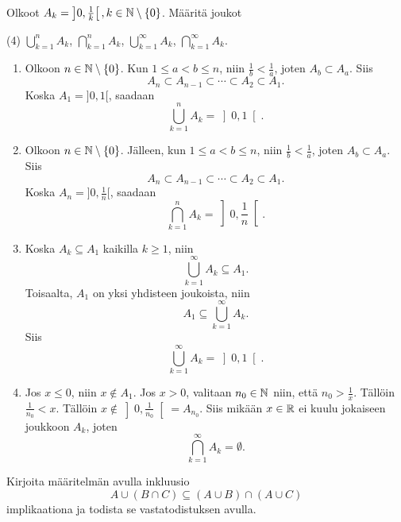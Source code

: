 \documentclass[11pt,a4paper]{amsart}
\begin{document}
\begin{exercise}
Olkoot \(A_k = \left]0, \frac{1}{k}\right[, k \in \mathbb{N} \setminus \left\lbrace0\right\rbrace\).
Määritä joukot
\begin{tasks}(4)
\task \(\displaystyle \bigcup_{k=1}^n A_k\),
\task \(\displaystyle \bigcap_{k=1}^n A_k\),
\task \(\displaystyle \bigcup_{k=1}^{\infty} A_k\),
\task \(\displaystyle \bigcap_{k=1}^{\infty} A_k\).
\end{tasks}
\end{exercise}

\begin{solution}
\leavevmode\par
\begin{enumerate}[label=\alph*), nosep]
\item Olkoon \(n \in \mathbb{N} \setminus{\left\lbrace0\right\rbrace}\). Kun \(1 \leq a < b \leq n\),
niin \(\frac{1}{b} < \frac{1}{a}\), joten \(A_b \subset A_a\). Siis
\[
A_n \subset A_{n - 1} \subset \cdots \subset A_2 \subset A_1.
\]
Koska \(A_1 = ]0, 1[\), saadaan
\[
\bigcup_{k=1}^n A_k = \left]0, 1\right[.
\]

\item Olkoon \(n \in \mathbb{N} \setminus{\left\lbrace0\right\rbrace}\). Jälleen, kun \(1 \leq
a < b \leq n\),
niin \(\frac{1}{b} < \frac{1}{a}\), joten \(A_b \subset A_a\). Siis
\[
A_n \subset A_{n - 1} \subset \cdots \subset A_2 \subset A_1.
\]
Koska \(A_n = ]0, \frac{1}{n}[\), saadaan
\[
\bigcap_{k=1}^n A_k = \left]0, \frac{1}{n}\right[.
\]

\item Koska \(A_k \subseteq A_1\) kaikilla \(k \geq 1\), niin
\[
\bigcup_{k=1}^{\infty} A_k \subseteq A_1.
\]
Toisaalta, \(A_1\) on yksi yhdisteen joukoista, niin
\[
A_1 \subseteq \bigcup_{k=1}^{\infty} A_k.
\]
Siis
\[
\bigcup_{k=1}^{\infty} A_k = \left]0, 1\right[.
\]

\item Jos \(x \leq 0\), niin \(x \notin A_1\). Jos \(x > 0\),
valitaan \(n_0 \in \mathbb{N}\) niin, että
\(n_0 > \frac{1}{x}\). Tällöin \(\frac{1}{n_0} < x\). Tällöin
\(x \notin\left]0, \frac{1}{n_0}\right[ = A_{n_0}\).
Siis mikään \(x \in \mathbb{R}\) ei kuulu jokaiseen joukkoon \(A_k\), joten
\[
\bigcap_{k = 1}^{\infty} A_k = \emptyset.
\]
\end{enumerate}
\end{solution}

\begin{exercise}
Kirjoita määritelmän avulla inkluusio
\[
A \cup (B \cap C) \subseteq (A \cup B) \cap (A \cup C)
\]
implikaationa ja todista se vastatodistuksen avulla.
\end{exercise}
\end{document}

